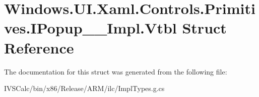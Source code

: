 \hypertarget{struct_windows_1_1_u_i_1_1_xaml_1_1_controls_1_1_primitives_1_1_i_popup_____impl_1_1_vtbl}{}\section{Windows.\+U\+I.\+Xaml.\+Controls.\+Primitives.\+I\+Popup\+\_\+\+\_\+\+Impl.\+Vtbl Struct Reference}
\label{struct_windows_1_1_u_i_1_1_xaml_1_1_controls_1_1_primitives_1_1_i_popup_____impl_1_1_vtbl}


The documentation for this struct was generated from the following file\+:\begin{DoxyCompactItemize}
\item 
I\+V\+S\+Calc/bin/x86/\+Release/\+A\+R\+M/ilc/Impl\+Types.\+g.\+cs\end{DoxyCompactItemize}
